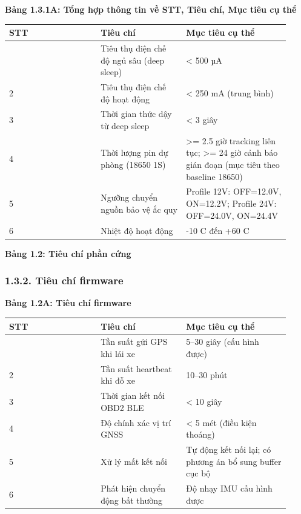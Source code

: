 \documentclass[13pt,a4paper]{extarticle}
\newcounter{none} %
\newcommand{\thesislongtableorignewline}{}
\let\thesislongtableorignewline\\
\renewcommand{\\}{\thesislongtableorignewline\hline}%
\let\\\thesislongtableorignewline
\newcommand{\thesistabletitle}[1]{%
  \begin{center}\textbf{#1}\end{center}%
}
\begin{document}
{\def\LTcaptype{none} %
\thesistabletitle{Bảng 1.3.1A: Tổng hợp thông tin về STT, Tiêu chí, Mục tiêu cụ thể}

\begin{longtable}{|p{0.30\linewidth}|p{0.28\linewidth}|p{0.34\linewidth}|}
\hline \textbf{STT} & \textbf{Tiêu chí} & \textbf{Mục tiêu cụ thể} \\
\hline
\endhead
\hline
\endlastfoot
1 & Tiêu thụ điện chế độ ngủ sâu (deep sleep) & \textless{} 500 µA \\
2 & Tiêu thụ điện chế độ hoạt động & \textless{} 250 mA (trung bình) \\
3 & Thời gian thức dậy từ deep sleep & \textless{} 3 giây \\
4 & Thời lượng pin dự phòng (18650 1S) & \textgreater= 2.5 giờ tracking
liên tục; \textgreater= 24 giờ cảnh báo gián đoạn (mục tiêu theo
baseline 18650) \\
5 & Ngưỡng chuyển nguồn bảo vệ ắc quy & Profile 12V: OFF=12.0V,
ON=12.2V; Profile 24V: OFF=24.0V, ON=24.4V \\
6 & Nhiệt độ hoạt động & -10 C đến +60 C \\
\end{longtable}
}

\thesistabletitle{Bảng 1.2: Tiêu chí phần cứng}

\subsubsection{1.3.2. Tiêu chí
firmware}\label{132-tiuxeau-chuxed-firmware}

\thesistabletitle{Bảng 1.2A: Tiêu chí firmware}

{\def\LTcaptype{none} %
\begin{longtable}{|p{0.30\linewidth}|p{0.28\linewidth}|p{0.34\linewidth}|}
\hline \textbf{STT} & \textbf{Tiêu chí} & \textbf{Mục tiêu cụ thể} \\
\hline
\endhead
\hline
\endlastfoot
1 & Tần suất gửi GPS khi lái xe & 5--30 giây (cấu hình được) \\
2 & Tần suất heartbeat khi đỗ xe & 10--30 phút \\
3 & Thời gian kết nối OBD2 BLE & \textless{} 10 giây \\
4 & Độ chính xác vị trí GNSS & \textless{} 5 mét (điều kiện thoáng) \\
5 & Xử lý mất kết nối & Tự động kết nối lại; có phương án bổ sung buffer
cục bộ \\
6 & Phát hiện chuyển động bất thường & Độ nhạy IMU cấu hình được \\
\end{longtable}
}
\end{document}
